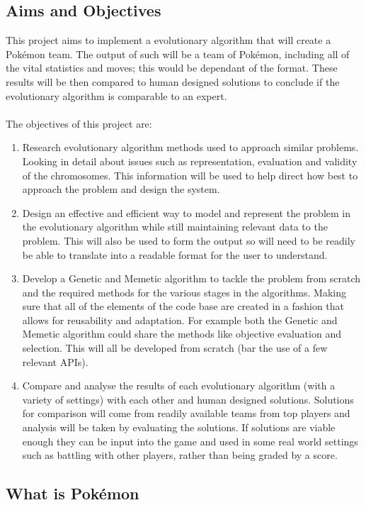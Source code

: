 \documentclass[a4paper]{article}
\newcommand{\Pokemon}{Pok\'{e}mon}
\begin{document}
\subsection{Aims and Objectives}
\par
This project aims to implement a evolutionary algorithm that will create a \Pokemon{} team.
The output of such will be a team of \Pokemon{}, including all of the vital statistics and moves; this would be dependant of the format.
These results will be then compared to human designed solutions to conclude if the evolutionary algorithm is comparable to an expert.
\\ \\The objectives of this project are:
\begin{enumerate}
    \item Research evolutionary algorithm methods used to approach similar problems.
    Looking in detail about issues such as representation, evaluation and validity of the chromosomes.
    This information will be used to help direct how best to approach the problem and design the system.
    \item Design an effective and efficient way to model and represent the problem in the evolutionary algorithm while still maintaining relevant data to the problem.
    This will also be used to form the output so will need to be readily be able to translate into a readable format for the user to understand.
    \item Develop a Genetic and Memetic algorithm to tackle the problem from scratch and the required methods for the various stages in the algorithms.
    Making sure that all of the elements of the code base are created in a fashion that allows for reusability and adaptation.
    For example both the Genetic and Memetic algorithm could share the methods like objective evaluation and selection.
    This will all be developed from scratch (bar the use of a few relevant APIs).
    \item Compare and analyse the results of each evolutionary algorithm (with a variety of settings) with each other and human designed solutions.
    Solutions for comparison will come from readily available teams from top players and analysis will be taken by evaluating the solutions.
    If solutions are viable enough they can be input into the game and used in some real world settings such as battling with other players, rather than being graded by a score.
\end{enumerate}

\subsection{What is \Pokemon{}}
\end{document}
